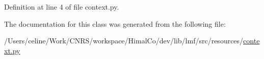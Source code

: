 Definition at line 4 of file context.\+py.



The documentation for this class was generated from the following file\+:\begin{DoxyCompactItemize}
\item 
/\+Users/celine/\+Work/\+C\+N\+R\+S/workspace/\+Himal\+Co/dev/lib/lmf/src/resources/\hyperlink{resources_2context_8py}{context.\+py}\end{DoxyCompactItemize}
